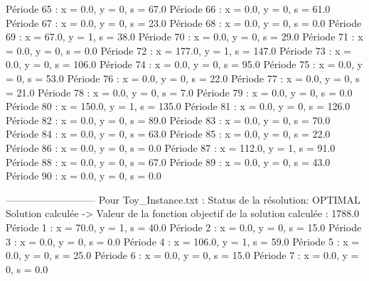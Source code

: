 Période 65 : x = 0.0, y = 0, s = 67.0
Période 66 : x = 0.0, y = 0, s = 61.0
Période 67 : x = 0.0, y = 0, s = 23.0
Période 68 : x = 0.0, y = 0, s = 0.0
Période 69 : x = 67.0, y = 1, s = 38.0
Période 70 : x = 0.0, y = 0, s = 29.0
Période 71 : x = 0.0, y = 0, s = 0.0
Période 72 : x = 177.0, y = 1, s = 147.0
Période 73 : x = 0.0, y = 0, s = 106.0
Période 74 : x = 0.0, y = 0, s = 95.0
Période 75 : x = 0.0, y = 0, s = 53.0
Période 76 : x = 0.0, y = 0, s = 22.0
Période 77 : x = 0.0, y = 0, s = 21.0
Période 78 : x = 0.0, y = 0, s = 7.0
Période 79 : x = 0.0, y = 0, s = 0.0
Période 80 : x = 150.0, y = 1, s = 135.0
Période 81 : x = 0.0, y = 0, s = 126.0
Période 82 : x = 0.0, y = 0, s = 89.0
Période 83 : x = 0.0, y = 0, s = 70.0
Période 84 : x = 0.0, y = 0, s = 63.0
Période 85 : x = 0.0, y = 0, s = 22.0
Période 86 : x = 0.0, y = 0, s = 0.0
Période 87 : x = 112.0, y = 1, s = 91.0
Période 88 : x = 0.0, y = 0, s = 67.0
Période 89 : x = 0.0, y = 0, s = 43.0
Période 90 : x = 0.0, y = 0, s = 0.0

---------------------------
Pour Toy_Instance.txt  :
Status de la résolution: OPTIMAL
Solution calculée
-> Valeur de la fonction objectif de la solution calculée :  1788.0
Période 1 : x = 70.0, y = 1, s = 40.0
Période 2 : x = 0.0, y = 0, s = 15.0
Période 3 : x = 0.0, y = 0, s = 0.0
Période 4 : x = 106.0, y = 1, s = 59.0
Période 5 : x = 0.0, y = 0, s = 25.0
Période 6 : x = 0.0, y = 0, s = 15.0
Période 7 : x = 0.0, y = 0, s = 0.0
